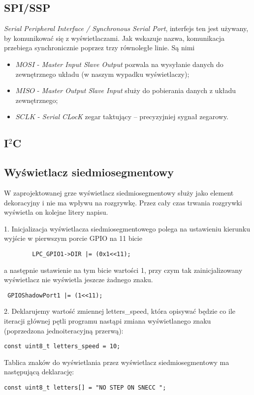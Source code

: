\documentclass[a4paper,12pt,twoside]{article}
\theoremstyle{plain}
\theoremstyle{definition}
\theoremstyle{remark}
\begin{document}
\subsection{SPI/SSP}
\textit{Serial Peripheral Interface / Synchronous Serial Port}, interfejs ten jest używany, by komunikować się z wyświetlaczami. Jak wskazuje nazwa, komunikacja przebiega synchronicznie poprzez trzy równoległe linie. Są nimi
\begin{itemize}
	\item $MOSI$ - \textit{Master Input Slave Output} pozwala na wysyłanie danych do zewnętrznego układu (w naszym wypadku wyświetlaczy);
	\item $MISO$ - \textit{Master Output Slave Input} służy do pobierania danych z układu zewnętrznego;
	\item $SCLK$ - \textit{Serial CLocK} zegar taktujący -- precyzyjniej sygnał zegarowy.
\end{itemize}

\subsection{I$^2$C}

\subsection{Wyświetlacz siedmiosegmentowy}
W zaprojektowanej grze wyświetlacz siedmiosegmentowy służy jako element dekoracyjny i nie ma wpływu na rozgrywkę. Przez cały czas trwania rozgrywki wyświetla on kolejne litery napisu.

1. Inicjalizacja wyświetlacza siedmiosegmentowego polega na ustawieniu kierunku wyjście w pierwszym porcie GPIO na 11 bicie
\begin{verbatim}
		LPC_GPIO1->DIR |= (0x1<<11);
\end{verbatim}
a następnie ustawienie na tym bicie wartości 1, przy czym tak zainicjalizowany wyświetlacz nie wyświetla jeszcze żadnego znaku.
\begin{verbatim}
 GPIOShadowPort1 |= (1<<11);
\end{verbatim}

2. Deklarujemy wartość zmiennej letters\_speed, która opisywać będzie co ile iteracji głównej pętli programu nastąpi zmiana wyświetlanego znaku (poprzedzona jednoiteracyjną przerwą):
\begin{verbatim}
const uint8_t letters_speed = 10;
\end{verbatim}
Tablica znaków do wyświetlania przez wyświetlacz siedmiosegmentowy ma następującą deklarację:
\begin{verbatim}
const uint8_t letters[] = "NO STEP ON SNECC ";
\end{verbatim}
\end{document}
